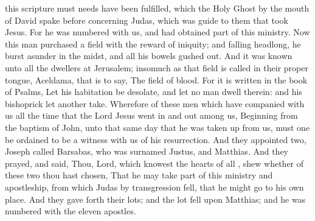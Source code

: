 {this
scripture must
needs have been
fulfilled,
which
the
Holy
Ghost
by the
mouth of
David spake
before
concerning
Judas, which
was
guide to them that
took
Jesus.
For
he
was
numbered
with
us,
and had
obtained
part of
this
ministry.
Now this
man
purchased a
field
with the
reward of
iniquity;
and
falling
headlong, he burst
asunder in the
midst,
and
all
his
bowels gushed
out.
And it
was
known unto
all the
dwellers at
Jerusalem; insomuch
as
that
field is
called in
their
proper
tongue,
Aceldama,
that is to
say, The
field of
blood.
For it is
written
in the
book of
Psalms,
Let
his
habitation
be
desolate,
and
let
no man
dwell
therein:
and
his
bishoprick
let
another
take.
Wherefore of these
men
which have
companied with
us
all the
time
that the
Lord
Jesus went
in
and
out
among
us,
Beginning
from the
baptism of
John,
unto that
same
day
that he was taken
up
from
us,
must
one be ordained to
be a
witness
with
us of
his
resurrection.
And they
appointed
two,
Joseph
called
Barsabas,
who was
surnamed
Justus,
and
Matthias.
And they
prayed,
and
said,
Thou,
Lord, which knowest the
hearts of
all
{},
shew
whether
of
these
two thou hast
chosen,
That he may
take
part of
this
ministry
and
apostleship,
from
which
Judas by
transgression fell, that he might
go
to his
own
place.
And they gave
forth
their
lots;
and the
lot
fell
upon
Matthias;
and he was
numbered
with the
eleven
apostles.

}
